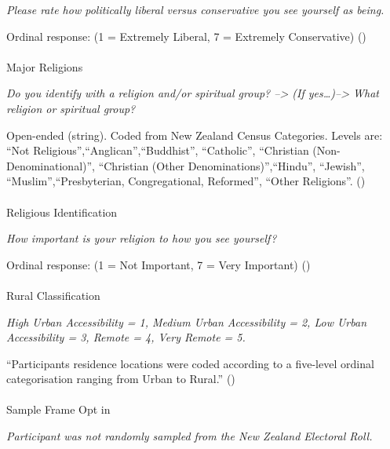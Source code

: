 \documentclass[
  single column]{article}
\makeatletter
\let\oldparagraph\paragraph
\renewcommand{\paragraph}{
    \@ifstar
      \xxxParagraphStar
      \xxxParagraphNoStar
  }
\newcommand{\xxxParagraphStar}[1]{\oldparagraph*{#1}\mbox{}}
\newcommand{\xxxParagraphNoStar}[1]{\oldparagraph{#1}\mbox{}}
\makeatother
\begin{document}
\emph{Please rate how politically liberal versus conservative you see
yourself as being.}

Ordinal response: (1 = Extremely Liberal, 7 = Extremely Conservative)
()

\paragraph{Major Religions}\label{major-religions}

\emph{Do you identify with a religion and/or spiritual group?
--\textgreater{} (If yes\ldots)--\textgreater{} What religion or
spiritual group?}

Open-ended (string). Coded from New Zealand Census Categories. Levels
are: ``Not Religious'',``Anglican'',``Buddhist'', ``Catholic'',
``Christian (Non-Denominational)'', ``Christian (Other
Denominations)'',``Hindu'', ``Jewish'', ``Muslim'',``Presbyterian,
Congregational, Reformed'', ``Other Religions''.
()

\paragraph{Religious Identification}\label{religious-identification}

\emph{How important is your religion to how you see yourself?}

Ordinal response: (1 = Not Important, 7 = Very Important)
()

\paragraph{Rural Classification}\label{rural-classification}

\emph{High Urban Accessibility = 1, Medium Urban Accessibility = 2, Low
Urban Accessibility = 3, Remote = 4, Very Remote = 5.}

``Participants residence locations were coded according to a five-level
ordinal categorisation ranging from Urban to Rural.''
()

\paragraph{Sample Frame Opt in}\label{sample-frame-opt-in}

\emph{Participant was not randomly sampled from the New Zealand
Electoral Roll.}
\end{document}
